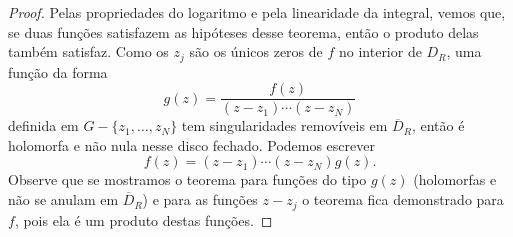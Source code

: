     \begin{proof}
        Pelas propriedades do logaritmo e pela linearidade da integral, vemos que, 
        se duas funções satisfazem as hipóteses desse teorema, então o produto delas
        também satisfaz. Como os $z_j$ são os únicos zeros de $f$ no interior de
        $D_R$, uma função da forma
        \begin{equation*}
            g(z) = \frac{f(z)}{(z-z_1) \cdots (z-z_N)}
        \end{equation*}
        definida em $G - \{z_1, \dots, z_N\}$ tem singularidades removíveis em
        $\overline{D}_R$, então é holomorfa e não nula nesse disco fechado. 
        Podemos escrever
        \begin{equation*}
            f(z) = (z-z_1)\cdots(z-z_N)g(z).
        \end{equation*}
        Observe que se mostramos o teorema para funções do tipo $g(z)$ 
        (holomorfas e não se anulam em $\overline{D}_R$) e para as funções $z-z_j$ 
        o teorema fica demonstrado para $f$, pois ela é um produto destas funções.
        

\end{proof}
